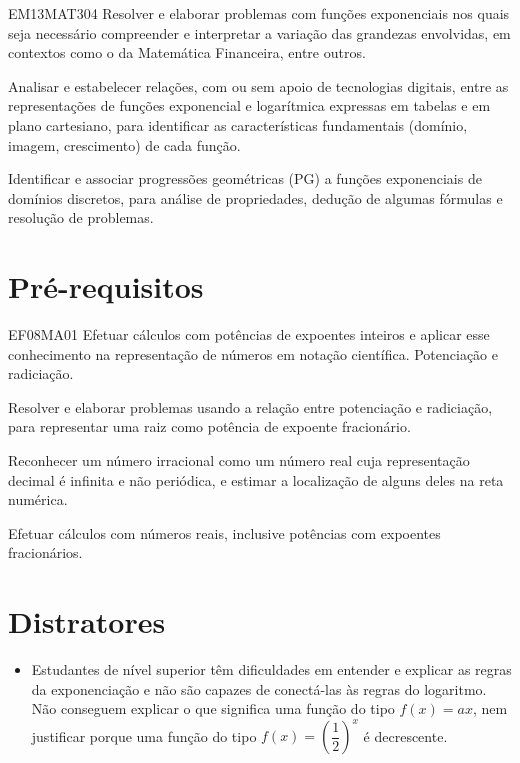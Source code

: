 \begin{apresentacao}
\begin{habilities}{EM13MAT304} 
Resolver e elaborar problemas com funções exponenciais nos quais seja necessário compreender e interpretar a variação das grandezas envolvidas, em contextos como o da Matemática Financeira, entre outros.

Analisar e estabelecer relações, com ou sem apoio de tecnologias digitais, entre as representações de funções exponencial e logarítmica expressas em tabelas e em plano cartesiano, para identificar as características fundamentais (domínio, imagem, crescimento) de cada função.

Identificar e associar progressões geométricas (PG) a funções exponenciais de domínios discretos, para análise de propriedades, dedução de algumas fórmulas e resolução de problemas.
\end{habilities}

\section*{Pré-requisitos}

\begin{habilities}{EF08MA01} 
Efetuar cálculos com potências de expoentes inteiros e aplicar esse conhecimento na representação de números em notação científica. Potenciação e radiciação.

Resolver e elaborar problemas usando a relação entre potenciação e radiciação, para representar uma raiz como potência de expoente fracionário.

Reconhecer um número irracional como um número real cuja representação decimal é infinita e não periódica, e estimar a localização de alguns deles na reta numérica.

Efetuar cálculos com números reais, inclusive potências com expoentes fracionários.
\end{habilities}

\section*{Distratores}

\begin{itemize}

\item Estudantes de nível superior têm dificuldades em entender e explicar as regras da exponenciação e não são capazes de conectá-las às regras do logaritmo. Não conseguem explicar o que significa uma função do tipo $f(x)=ax$, nem justificar porque uma função do tipo $f(x)=\left(\dfrac{1}{2} \right)^{x}$ é decrescente. \citep{Weber2002}


\end{itemize}
\end{apresentacao}
